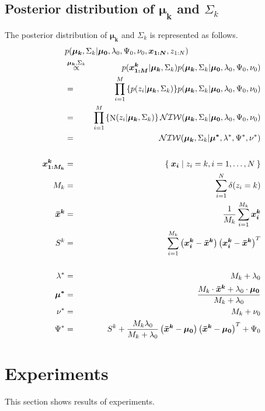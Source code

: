 \documentclass[a4paper]{article}
\DeclareMathOperator{\N}{\rm N}
\DeclareMathOperator{\NIW}{\mathcal{NIW}}
\newcommand{\proptoas}[1]{\overset{#1}{\propto}}
\begin{document}
\subsection{Posterior distribution of $\boldsymbol{\mu_k}$ and $\Sigma_k$}
The posterior distribution of $\boldsymbol{\mu_k}$ and $\Sigma_k$ is represented as follows.
\begin{eqnarray}
	\lefteqn{
		p(\boldsymbol{\mu_k}, \Sigma_k | \boldsymbol{\mu_0}, \lambda_0, \Psi_0, \nu_0, \boldsymbol{x_{1:N}}, z_{1:N})
	}\nonumber \\
	&\proptoas{\boldsymbol{\mu_k}, \Sigma_k}& p(\boldsymbol{x^{k}_{1:M}} | \boldsymbol{\mu_k}, \Sigma_k) p(\boldsymbol{\mu_k}, \Sigma_k | \boldsymbol{\mu_0}, \lambda_0, \Psi_0, \nu_0)\\
	&=& \prod_{i=1}^{M}{\left\{ p(z_i | \boldsymbol{\mu_k}, \Sigma_k) \right\}} p(\boldsymbol{\mu_k}, \Sigma_k | \boldsymbol{\mu_0}, \lambda_0, \Psi_0, \nu_0) \\
	&=& \prod_{i=1}^{M}{\left\{ \N(z_i | \boldsymbol{\mu_k}, \Sigma_k) \right\}} \NIW(\boldsymbol{\mu_k}, \Sigma_k | \boldsymbol{\mu_0}, \lambda_0, \Psi_0, \nu_0) \\
	&=& \NIW(\boldsymbol{\mu_k}, \Sigma_k | \boldsymbol{\mu^*}, \lambda^*, \Psi^*, \nu^*) \\
	\nonumber \\
	\boldsymbol{x^{k}_{1:M_k}} &=& \Set{ \boldsymbol{x_i} | z_i = k, i=1, \ldots, N }\\
	M_k &=& \sum_{i=1}^{N}{\delta(z_i = k)} \\
	\boldsymbol{\bar{x}^k} &=& \frac{1}{M_k} \sum_{i=1}^{M_k}{\boldsymbol{x_i^k}} \\
	S^k &=& \sum_{i=1}^{M_k}{\left( \boldsymbol{x_i^k} - \boldsymbol{\bar{x}^k} \right) \left( \boldsymbol{x_i^k} - \boldsymbol{\bar{x}^k} \right)^T} \\
	\nonumber \\
	\lambda^* &=& M_k + \lambda_0 \\
	\boldsymbol{\mu^*} &=& \frac{M_k \cdot \boldsymbol{\bar{x}^k} + \lambda_0 \cdot \boldsymbol{\mu_0}}{M_k + \lambda_0}\\
	\nu^* &=& M_k + \nu_0\\
	\Psi^* &=& S^k + \frac{M_k \lambda_0}{M_k + \lambda_0} \left( \boldsymbol{\bar{x}^k} - \boldsymbol{\mu_0} \right) \left( \boldsymbol{\bar{x}^k} - \boldsymbol{\mu_0} \right)^T + \Psi_0
\end{eqnarray}

\section{Experiments}
This section shows results of experiments.
\end{document}
